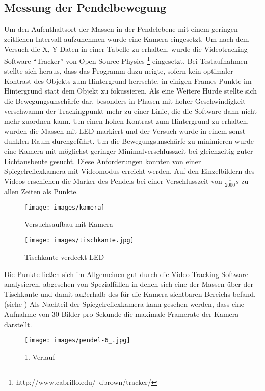 \subsection{Messung der Pendelbewegung}
Um den Aufenthaltsort der Massen in der Pendelebene mit einem geringen zeitlichen Intervall aufzunehmen wurde eine Kamera eingesetzt. Um nach dem Versuch die X, Y Daten in einer Tabelle zu erhalten, wurde die Videotracking Software \enquote{Tracker} von Open Source Physics \footnote{http://www.cabrillo.edu/~dbrown/tracker/} eingesetzt.
Bei Testaufnahmen stellte sich heraus, dass das Programm dazu neigte, sofern kein optimaler Kontrast des Objekts zum Hintergrund herrschte, in einigen Frames Punkte im Hintergrund statt dem Objekt zu fokussieren. Als eine Weitere Hürde stellte sich die Bewegungsunschärfe dar, besonders in Phasen mit hoher Geschwindigkeit verschwamm der Trackingpunkt mehr zu einer Linie, die die Software dann nicht mehr zuordnen kann. Um einen hohen Kontrast zum Hintergrund zu erhalten, wurden die Massen mit LED markiert und der Versuch wurde in einem sonst dunklen Raum durchgeführt. Um die Bewegungsunschärfe zu minimieren wurde eine Kamera mit möglichst geringer Minimalverschlusszeit bei gleichzeitig guter Lichtausbeute gesucht. Diese Anforderungen konnten von einer Spiegelreflexkamera mit Videomodus erreicht werden. Auf den Einzelbildern des Videos erschienen die Marker des Pendels bei einer Verschlusszeit von $\frac{1}{2000} s$ zu allen Zeiten als Punkte.
\begin{figure}
\centering
\texttt{[image: images/kamera]}
\caption{Versuchsaufbau mit Kamera}
\label{foto-kamera}
\end{figure}
\begin{figure}
\centering
\texttt{[image: images/tischkante.jpg]}
\caption{Tischkante verdeckt LED}
\label{tischkante}
\end{figure}
 Die Punkte ließen sich im Allgemeinen gut durch die Video Tracking Software analysieren, abgesehen von Spezialfällen in denen sich eine der Massen über der Tischkante und damit außerhalb des für die Kamera sichtbaren Bereichs befand.(siehe )
Als Nachteil der Spiegelreflexkamera kann gesehen werden, dass eine Aufnahme von 30 Bilder pro Sekunde die maximale Framerate der Kamera darstellt.
\begin{comment}
\begin{figure}
\texttt{[image: images/platten]}
\end{figure}
\end{comment}
\begin{figure}[b!]
        \texttt{[image: images/pendel-6\_.jpg]}
\caption{1. Verlauf}
\label{pendel-6}
\end{figure}
